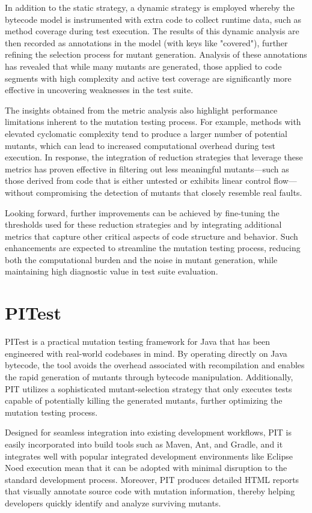 \documentclass[sigplan, nonacm]{acmart}
\begin{document}
In addition to the static strategy, a dynamic strategy is employed whereby the
bytecode model is instrumented with extra code to collect runtime data, such
as method coverage during test execution. The results of this dynamic
analysis are then recorded as annotations in the model (with keys like
"covered"), further refining the selection process for mutant generation.
Analysis of these annotations has revealed that while many mutants are
generated, those applied to code segments with high complexity and active
test coverage are significantly more effective in uncovering weaknesses in
the test suite.

The insights obtained from the metric analysis also highlight performance
limitations inherent to the mutation testing process. For example, methods
with elevated cyclomatic complexity tend to produce a larger number of
potential mutants, which can lead to increased computational overhead during
test execution. In response, the integration of reduction strategies that
leverage these metrics has proven effective in filtering out less meaningful
mutants—such as those derived from code that is either untested or exhibits
linear control flow—without compromising the detection of mutants that
closely resemble real faults.

Looking forward, further improvements can be achieved by fine-tuning the
thresholds used for these reduction strategies and by integrating additional
metrics that capture other critical aspects of code structure and behavior.
Such enhancements are expected to streamline the mutation testing process,
reducing both the computational burden and the noise in mutant generation,
while maintaining high diagnostic value in test suite evaluation.

\section{PITest}

PITest is a practical mutation testing framework for Java that has been
engineered with real-world codebases in mind. By operating directly on Java
bytecode, the tool avoids the overhead associated with recompilation and
enables the rapid generation of mutants through bytecode manipulation.
Additionally, PIT utilizes a sophisticated mutant-selection strategy that
only executes tests capable of potentially killing the generated mutants,
further optimizing the mutation testing process.

Designed for seamless integration into existing development workflows, PIT is
easily incorporated into build tools such as Maven, Ant, and Gradle, and it
integrates well with popular integrated development environments like Eclipse
Noed
execution mean that it can be adopted with minimal disruption to the standard
development process. Moreover, PIT produces detailed HTML reports that
visually annotate source code with mutation information, thereby helping
developers quickly identify and analyze surviving mutants.
\end{document}
